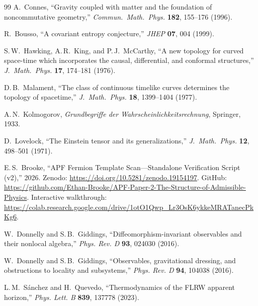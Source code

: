 \documentclass[11pt]{article}
\theoremstyle{definition}
\begin{document}
\begin{thebibliography}{99}
A.~Connes, ``Gravity coupled with matter and the foundation of
noncommutative geometry,''
\textit{Commun.\ Math.\ Phys.} \textbf{182}, 155--176 (1996).

R.~Bousso, ``A covariant entropy conjecture,''
\textit{JHEP} \textbf{07}, 004 (1999).

S.\,W.~Hawking, A.\,R.~King, and P.\,J.~McCarthy,
``A new topology for curved space-time which incorporates the causal,
differential, and conformal structures,''
\textit{J.\ Math.\ Phys.} \textbf{17}, 174--181 (1976).

D.\,B.~Malament, ``The class of continuous timelike curves determines
the topology of spacetime,''
\textit{J.\ Math.\ Phys.} \textbf{18}, 1399--1404 (1977).

A.\,N.~Kolmogorov, \textit{Grundbegriffe der Wahrscheinlichkeitsrechnung},
Springer, 1933.

D.~Lovelock, ``The Einstein tensor and its generalizations,''
\textit{J.\ Math.\ Phys.} \textbf{12}, 498--501 (1971).

E.\,S.~Brooke, ``APF Fermion Template Scan---Standalone Verification
Script (v2),'' 2026.
Zenodo: \url{https://doi.org/10.5281/zenodo.19154197}.
GitHub: \url{https://github.com/Ethan-Brooke/APF-Paper-2-The-Structure-of-Admissible-Physics}.
Interactive walkthrough:
\url{https://colab.research.google.com/drive/1otO1Qwp_Lr3OsK6ykkeMRATanecPkKg6}.

W.~Donnelly and S.\,B.~Giddings, ``Diffeomorphism-invariant observables
and their nonlocal algebra,'' \textit{Phys. Rev. D} \textbf{93}, 024030
(2016).

W.~Donnelly and S.\,B.~Giddings, ``Observables, gravitational dressing,
and obstructions to locality and subsystems,'' \textit{Phys. Rev. D}
\textbf{94}, 104038 (2016).

L.\,M.~S\'anchez and H.~Quevedo, ``Thermodynamics of the FLRW apparent
horizon,'' \textit{Phys. Lett. B} \textbf{839}, 137778 (2023).

\end{thebibliography}
\end{document}

